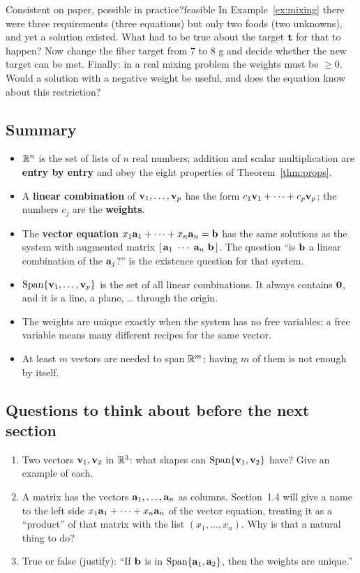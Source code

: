 \documentclass[11pt]{article}
\begin{document}
\begin{think}{Consistent on paper, possible in practice?}{feasible}
In Example~\ref{ex:mixing} there were three requirements (three equations) but only two foods (two unknowns), and yet a solution
existed. What had to be true about the target $\mathbf{t}$ for that to happen? Now change the fiber target from $7$ to $8$ g and decide
whether the new target can be met. Finally: in a real mixing problem the weights must be $\ge 0$. Would a
solution with a negative weight be useful, and does the equation know about this restriction?
\end{think}

\subsection*{Summary}
\begin{itemize}
  \item $\mathbb{R}^n$ is the set of lists of $n$ real numbers; addition and scalar multiplication are \textbf{entry by entry} and obey the eight
        properties of Theorem~\ref{thm:props}.
  \item A \textbf{linear combination} of $\mathbf{v}_1,\dots,\mathbf{v}_p$ has the form $c_1\mathbf{v}_1+\cdots+c_p\mathbf{v}_p$; the numbers $c_j$ are the \textbf{weights}.
  \item The \textbf{vector equation} $x_1\mathbf{a}_1+\cdots+x_n\mathbf{a}_n=\mathbf{b}$ has the same solutions as the system with augmented matrix
        $[\,\mathbf{a}_1\ \cdots\ \mathbf{a}_n\ \mathbf{b}\,]$. The question ``is $\mathbf{b}$ a linear combination of the $\mathbf{a}_j$?'' is the existence
        question for that system.
  \item \textbf{$\operatorname{Span}\{\mathbf{v}_1,\dots,\mathbf{v}_p\}$} is the set of all linear combinations. It always contains $\mathbf{0}$, and it is a line, a plane, \dots{} through the origin.
  \item The weights are unique exactly when the system has no free variables; a free variable means many different recipes for the same vector.
  \item At least $m$ vectors are needed to span $\mathbb{R}^m$; having $m$ of them is not enough by itself.
\end{itemize}

\subsection*{Questions to think about before the next section}
\begin{enumerate}
  \item Two vectors $\mathbf{v}_1,\mathbf{v}_2$ in $\mathbb{R}^3$: what shapes can $\operatorname{Span}\{\mathbf{v}_1,\mathbf{v}_2\}$ have? Give an example of each.
  \item A matrix has the vectors $\mathbf{a}_1,\dots,\mathbf{a}_n$ as columns. Section~1.4 will give a name to the left side
        $x_1\mathbf{a}_1+\cdots+x_n\mathbf{a}_n$ of the vector equation, treating it as a ``product'' of that matrix with the list $(x_1,\dots,x_n)$.
        Why is that a natural thing to do?
  \item True or false (justify): ``If $\mathbf{b}$ is in $\operatorname{Span}\{\mathbf{a}_1,\mathbf{a}_2\}$, then the weights are unique.''
\end{enumerate}
\end{document}
